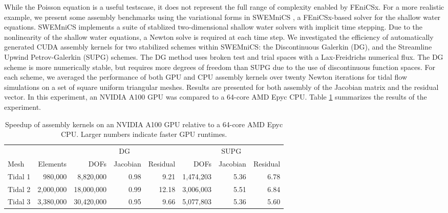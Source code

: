 While the Poisson equation is a useful testscase, it does not represent the full range of complexity enabled by FEniCSx. For a more realistic example, we present some assembly benchmarks using the variational forms in SWEMniCS \citep{dawson2024swemnics}, a FEniCSx-based solver for the shallow water equations. SWEMniCS implements a suite of stablized two-dimensional shallow water solvers with implicit time stepping. Due to the nonlinearity of the shallow water equations, a Newton solve is required at each time step. We investigated the efficiency of automatically generated CUDA assembly kernels for two stabilized schemes within SWEMniCS: the Discontinuous Galerkin (DG), and the Streamline Upwind Petrov-Galerkin (SUPG) schemes. The DG method uses broken test and trial spaces with a Lax-Freidrichs numerical flux. The DG scheme is more numerically stable, but requires more degrees of freedom than SUPG due to the use of discontinuous function spaces. For each scheme, we averaged the performance of both GPU and CPU assembly kernels over twenty Newton iterations for tidal flow simulations on a set of square uniform triangular meshes. Results are presented for both assembly of the Jacobian matrix and the residual vector. In this experiment, an NVIDIA A100 GPU was compared to a 64-core AMD Epyc CPU.
Table \ref{tab:swe_a100_vs_epyc} summarizes the results of the experiment.
\begin{table}[t]
    \centering
    \begin{tabular}{lrrrrrrr}
\toprule
        &           &           \multicolumn{3}{c}{DG} & \multicolumn{3}{c}{SUPG} \\
                                  \cmidrule(lr){3-5}       \cmidrule(lr){6-8}
Mesh    &  Elements &  DOFs & Jacobian & Residual  & DOFs  & Jacobian & Residual \\
\midrule
Tidal 1 &   980,000 &   8,820,000 &     0.98 &    9.21 &  1,474,203 &   5.36 &     6.78 \\
Tidal 2 & 2,000,000 & 18,000,000 &     0.99 &     12.18 &  3,006,003 &   5.51 &     6.84 \\
Tidal 3 & 3,380,000 & 30,420,000 &     0.95 &      9.66 &  5,077,803 &   5.36 &     5.60 \\
\bottomrule
\end{tabular}
    \caption{Speedup of assembly kernels on an NVIDIA A100 GPU relative to a 64-core AMD Epyc CPU. Larger numbers indicate faster GPU runtimes.}
    \label{tab:swe_a100_vs_epyc}
\end{table}

